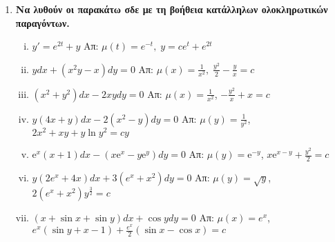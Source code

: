 \documentclass[a4paper,table]{report}
\begin{document}
\begin{enumerate}
  \item {\bfseries Να λυθούν οι παρακάτω σδε με τη βοήθεια κατάλληλων ολοκληρωτικών
    παραγόντων.}

    \begin{enumerate}[i)]

      \item $ y' = e^{2t}+y $ \hfill Απ: $ \mu (t) = e^{-t}, \; y=ce^{t}+e^{2t} $ 
      \item $ ydx+(x^{2}y-x)dy=0 $ \hfill Απ: $ \mu (x) = \frac{1}{x^{2}}, \;
        \frac{y^{2}}{2} - \frac{y}{x} = c $ 
      \item $ (x^{2}+y^{2})dx - 2xydy = 0 $ 
        \hfill Απ: $\mu(x)= \frac{1}{x^{2}}$, $ - \frac{y^{2}}{x} + x = c $
      \item $ y(4x+y)dx-2(x^{2}-y)dy=0 $ 
        \hfill Απ: $ \mu(y)= \frac{1}{y^{2}} $, $ 2x^{2}+xy+ y \ln{y^{2}} =cy$ 
      \item $ \mathrm{e}^{x}(x+1)dx-(x \mathrm{e}^{x}-y \mathrm{e}^{y})dy = 0 $
        \hfill Απ: $\mu(y)=\mathrm{e}^{-y} $, $x \mathrm{e}^{x-y} + \frac{y^{2}}{2}=c $
      \item $ y(2e^{x}+4x)dx + 3(e^{x}+x^{2})dy = 0 $ 
        \hfill Απ: $ \mu(y)= \sqrt{ y } $, $ 2(e^{x}+x^{2})y^{\frac{3}{2}}=c $ 
      \item $ (x + \sin{x} + \sin{y})dx + \cos{y} dy =0 $ 
        \hfill Απ: $\mu(x)=e^{x} $, $ e^x(\sin{y} + x-1) + \frac{e^{x}}{2} 
        (\sin{x} - \cos{x})=c $
    \end{enumerate}


\end{enumerate}
\end{document}
